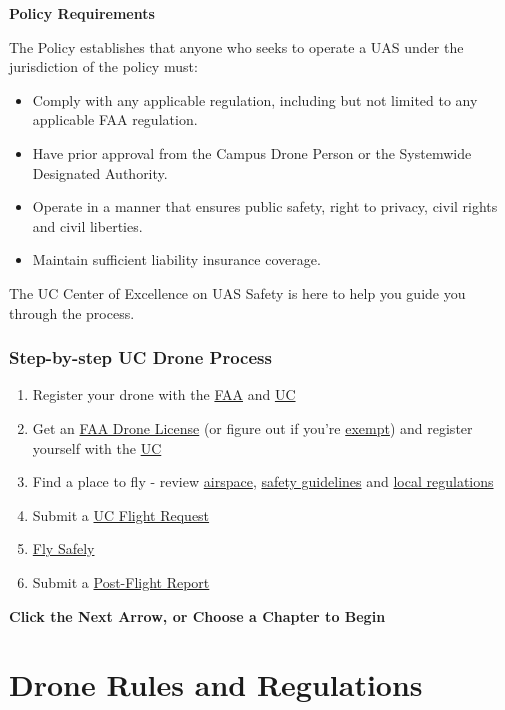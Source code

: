 \documentclass[
  12pt,
]{book}
\providecommand{\tightlist}{%
  \setlength{\itemsep}{0pt}\setlength{\parskip}{0pt}}
\begin{document}
\textbf{Policy Requirements}

The Policy establishes that anyone who seeks to operate a UAS under the jurisdiction of the policy must:

\begin{itemize}
\tightlist
\item
  Comply with any applicable regulation, including but not limited to any applicable FAA regulation.
\item
  Have prior approval from the Campus Drone Person or the Systemwide Designated Authority.
\item
  Operate in a manner that ensures public safety, right to privacy, civil rights and civil liberties.
\item
  Maintain sufficient liability insurance coverage.
\end{itemize}

The UC Center of Excellence on UAS Safety is here to help you guide you through the process.

\subsection*{Step-by-step UC Drone Process}\label{step-by-step-uc-drone-process}

\begin{enumerate}
\def\labelenumi{\arabic{enumi}.}
\tightlist
\item
  Register your drone with the \hyperref[registration]{FAA} and \hyperref[UCDrones-drone]{UC}
\item
  Get an \hyperref[license]{FAA Drone License} (or figure out if you're \hyperref[difference]{exempt}) and register yourself with the \hyperref[UCDrones-pilot]{UC}
\item
  Find a place to fly - review \hyperref[airspace-info]{airspace}, \hyperref[safety]{safety guidelines} and \hyperref[local-regulations]{local regulations}
\item
  Submit a \hyperref[UCDrones-project]{UC Flight Request}
\item
  \hyperref[tips]{Fly Safely}
\item
  Submit a \hyperref[UCDrones-post]{Post-Flight Report}
\end{enumerate}

\textbf{Click the Next Arrow, or Choose a Chapter to Begin}

\chapter{Drone Rules and Regulations}\label{regulations}
\end{document}
